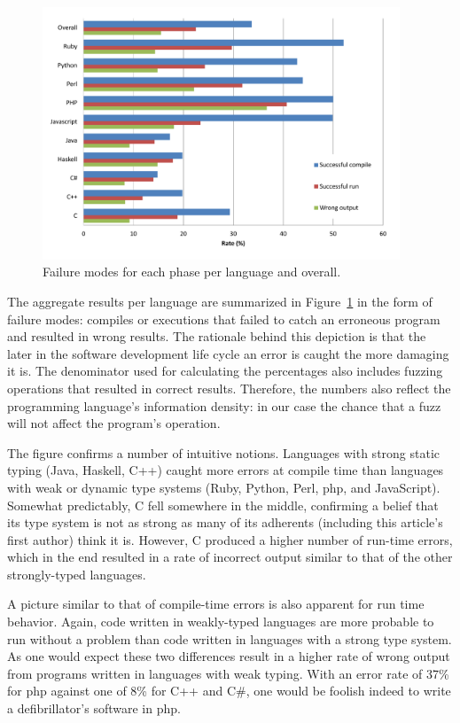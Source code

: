\documentclass[10pt]{sigplanconf}
\begin{document}
\begin{figure}
        \begin{center}
                \includegraphics[width=0.95\textwidth]{chart}
        \end{center}
        \caption{Failure modes for each phase per language and overall.}
        \label{fig:results}
\end{figure}

The aggregate results per language are summarized in Figure~\ref{fig:results}
in the form of failure modes:
compiles or executions that failed to catch an erroneous program and
resulted in wrong results.
The rationale behind this depiction is that the later in the software
development life cycle an error is caught the more damaging it is.
The denominator used for calculating the percentages also includes
fuzzing operations that resulted in correct results.
Therefore, the numbers also reflect the programming language's
information density:
in our case the chance that a fuzz will not affect the program's operation.

The figure confirms a number of intuitive notions.
Languages with strong static typing (Java, Haskell, C++)
caught more errors at compile time than languages
with weak or dynamic type systems
(Ruby, Python, Perl, {\sc php}, and JavaScript).
Somewhat predictably, C fell somewhere in the middle,
confirming a belief that its type system is not as strong
as many of its adherents (including this article's first author)
think it is.
However, C produced a higher number of run-time errors,
which in the end resulted in a rate of incorrect output
similar to that of the other strongly-typed languages.

A picture similar to that of compile-time errors
is also apparent for run time behavior.
Again, code written in weakly-typed languages are more probable to run without
a problem than code written in languages with a strong type system.
As one would expect these two differences result in a higher rate of
wrong output from programs written in languages with weak typing.
With an error rate of 37\% for {\sc php} against one of 8\% for
C++ and C\#, one would be foolish indeed to write a defibrillator's
software in {\sc php}.
\end{document}
